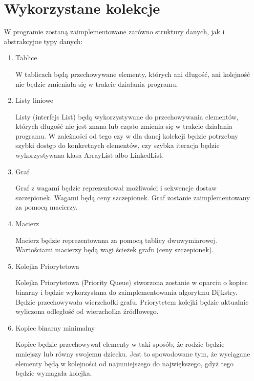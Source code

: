 \documentclass{article}
\begin{document}
\section{Wykorzystane kolekcje}
{\fontsize{13}{13}\selectfont
      W programie zostaną zaimplementowane zarówno struktury danych, jak i abstrakcyjne typy danych:
    \begin{enumerate}
        \item Tablice
        
        W tablicach będą przechowywane elementy, których ani długość, ani kolejność nie będzie zmieniała się w trakcie działania programu. 
        \item Listy liniowe 
        
        Listy (interfejs List) będą wykorzystywane do przechowywania elementów, których długość nie jest znana lub często zmienia się w trakcie działania programu. W zależności od tego czy w dla danej kolekcji będzie potrzebny szybki dostęp do konkretnych elementów, czy szybka iteracja będzie wykorzystywana klasa ArrayList albo LinkedList.
        \item Graf
        
        Graf z wagami będzie reprezentował możliwości i sekwencje dostaw szczepionek. Wagami będą ceny szczepionek. Graf zostanie zaimplementowany za pomocą macierzy.
        \item Macierz
        
        Macierz będzie reprezentowana za pomocą tablicy dwuwymiarowej. Wartościami macierzy będą wagi ścieżek grafu (ceny szczepionek).
        
        \item Kolejka Priorytetowa
        
        Kolejka Priorytetowa (Priority Queue) stworzona zostanie w oparciu o kopiec binarny i będzie wykorzystana do zaimplementowania algorytmu Dijkstry. Będzie przechowywała wierzchołki grafu. Priorytetem kolejki będzie aktualnie wyliczona odległość od wierzchołka źródłowego.
        
        \item Kopiec binarny minimalny
        
        Kopiec będzie przechowywał elementy w taki sposób, że rodzic będzie mniejszy lub równy swojemu dziecku. Jest to spowodowane tym, że wyciągane elementy będą w kolejności od najmniejszego do największego, gdyż tego będzie wymagała kolejka.
    \end{enumerate}
}
\newpage
\end{document}
